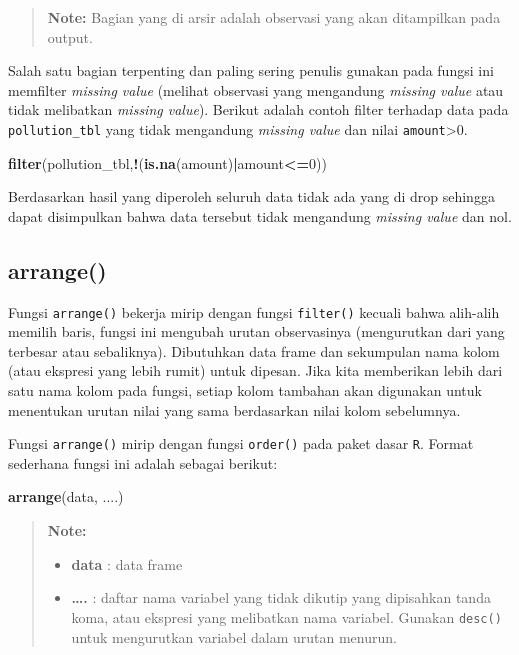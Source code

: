 \documentclass[]{book}
\newenvironment{Shaded}{\begin{snugshade}}{\end{snugshade}}
\newcommand{\KeywordTok}[1]{\textcolor[rgb]{0.13,0.29,0.53}{\textbf{#1}}}
\newcommand{\DecValTok}[1]{\textcolor[rgb]{0.00,0.00,0.81}{#1}}
\newcommand{\OperatorTok}[1]{\textcolor[rgb]{0.81,0.36,0.00}{\textbf{#1}}}
\newcommand{\NormalTok}[1]{#1}
\providecommand{\tightlist}{%
  \setlength{\itemsep}{0pt}\setlength{\parskip}{0pt}}
\begin{document}
\begin{quote}
\textbf{Note: } Bagian yang di arsir adalah observasi yang akan
ditampilkan pada output.
\end{quote}

Salah satu bagian terpenting dan paling sering penulis gunakan pada
fungsi ini memfilter \emph{missing value} (melihat observasi yang
mengandung \emph{missing value} atau tidak melibatkan \emph{missing
value}). Berikut adalah contoh filter terhadap data pada
\texttt{pollution\_tbl} yang tidak mengandung \emph{missing value} dan
nilai \texttt{amount}\textgreater{}0.

\begin{Shaded}
\begin{Highlighting}[]
\KeywordTok{filter}\NormalTok{(pollution_tbl,}\OperatorTok{!}\NormalTok{(}\KeywordTok{is.na}\NormalTok{(amount)}\OperatorTok{|}\NormalTok{amount}\OperatorTok{<=}\DecValTok{0}\NormalTok{))}
\end{Highlighting}
\end{Shaded}

Berdasarkan hasil yang diperoleh seluruh data tidak ada yang di drop
sehingga dapat disimpulkan bahwa data tersebut tidak mengandung
\emph{missing value} dan nol.

\subsection{arrange()}\label{arrange}

Fungsi \texttt{arrange()} bekerja mirip dengan fungsi \texttt{filter()}
kecuali bahwa alih-alih memilih baris, fungsi ini mengubah urutan
observasinya (mengurutkan dari yang terbesar atau sebaliknya).
Dibutuhkan data frame dan sekumpulan nama kolom (atau ekspresi yang
lebih rumit) untuk dipesan. Jika kita memberikan lebih dari satu nama
kolom pada fungsi, setiap kolom tambahan akan digunakan untuk menentukan
urutan nilai yang sama berdasarkan nilai kolom sebelumnya.

Fungsi \texttt{arrange()} mirip dengan fungsi \texttt{order()} pada
paket dasar \texttt{R}. Format sederhana fungsi ini adalah sebagai
berikut:

\begin{Shaded}
\begin{Highlighting}[]
\KeywordTok{arrange}\NormalTok{(data, ....)}
\end{Highlighting}
\end{Shaded}

\begin{quote}
\textbf{Note: }

\begin{itemize}
\tightlist
\item
  \textbf{data} : data frame
\item
  \textbf{\ldots{}.} : daftar nama variabel yang tidak dikutip yang
  dipisahkan tanda koma, atau ekspresi yang melibatkan nama variabel.
  Gunakan \texttt{desc()} untuk mengurutkan variabel dalam urutan
  menurun.
\end{itemize}
\end{quote}
\end{document}
